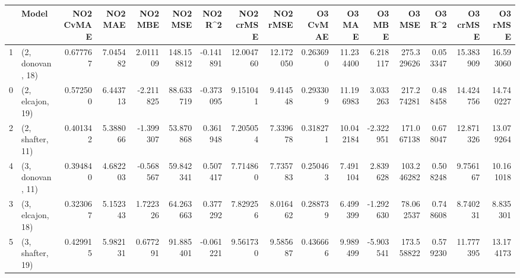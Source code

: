 \begin{tabular}{llrrrrrrrrrrrrrr}
\toprule
{} &             Model &  NO2 CvMAE &   NO2 MAE &   NO2 MBE &     NO2 MSE &   NO2 R\textasciicircum2 &  NO2 crMSE &   NO2 rMSE &  O3 CvMAE &     O3 MAE &    O3 MBE &      O3 MSE &    O3 R\textasciicircum2 &   O3 crMSE &    O3 rMSE \\
\midrule
1 &  (2, donovan, 18) &   0.677767 &  7.045482 &  2.011109 &  148.158812 & -0.141891 &  12.004760 &  12.172050 &  0.263690 &  11.234400 &  6.218117 &  275.329626 &  0.053347 &  15.383909 &  16.593060 \\
0 &  (2, elcajon, 19) &   0.572500 &  6.443713 & -2.211825 &   88.633719 & -0.373095 &   9.151041 &   9.414548 &  0.293309 &  11.196983 &  3.033263 &  217.274281 &  0.488458 &  14.424756 &  14.740227 \\
2 &  (2, shafter, 11) &   0.401342 &  5.388066 & -1.399307 &   53.870868 &  0.361948 &   7.205054 &   7.339678 &  0.318271 &  10.042184 & -2.322951 &  171.067138 &  0.678047 &  12.871326 &  13.079264 \\
4 &  (3, donovan, 11) &   0.394840 &  4.682203 & -0.568567 &   59.842341 &  0.507417 &   7.714860 &   7.735783 &  0.250463 &   7.491104 &  2.839628 &  103.246282 &  0.508248 &   9.756167 &  10.161018 \\
3 &  (3, elcajon, 18) &   0.323067 &  5.152343 &  1.722326 &   64.263663 &  0.377292 &   7.829256 &   8.016462 &  0.288739 &   6.499399 & -1.292630 &   78.062537 &  0.748608 &   8.740231 &   8.835301 \\
5 &  (3, shafter, 19) &   0.429915 &  5.982131 &  0.677291 &   91.885401 & -0.061221 &   9.561730 &   9.585687 &  0.436666 &   9.989499 & -5.903541 &  173.558822 &  0.579230 &  11.777395 &  13.174173 \\
\bottomrule
\end{tabular}
